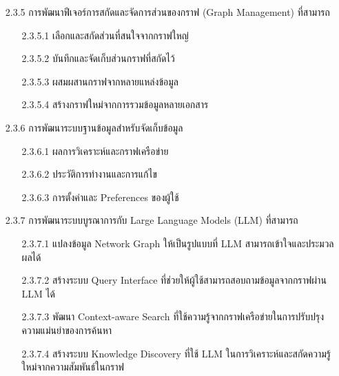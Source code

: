 \documentclass[12pt,a4paper]{article}
\begin{document}
\begin{enumerate}[leftmargin=2cm]
{\begin{enumerate}
\begin{enumerate}
            \end{enumerate}
            \item[2.3.5] การพัฒนาฟีเจอร์การสกัดและจัดการส่วนของกราฟ (Graph Management) ที่สามารถ
            \begin{enumerate}
                \item[2.3.5.1] เลือกและสกัดส่วนที่สนใจจากกราฟใหญ่
                \item[2.3.5.2] บันทึกและจัดเก็บส่วนกราฟที่สกัดไว้
                \item[2.3.5.3] ผสมผสานกราฟจากหลายแหล่งข้อมูล
                \item[2.3.5.4] สร้างกราฟใหม่จากการรวมข้อมูลหลายเอกสาร
            \end{enumerate}
            \item[2.3.6] การพัฒนาระบบฐานข้อมูลสำหรับจัดเก็บข้อมูล
            \begin{enumerate}
                \item[2.3.6.1] ผลการวิเคราะห์และกราฟเครือข่าย
                \item[2.3.6.2] ประวัติการทำงานและการแก้ไข
                \item[2.3.6.3] การตั้งค่าและ Preferences ของผู้ใช้
            \end{enumerate}
            \item[2.3.7] การพัฒนาระบบบูรณาการกับ Large Language Models (LLM) ที่สามารถ
            \begin{enumerate}
                \item[2.3.7.1] แปลงข้อมูล Network Graph ให้เป็นรูปแบบที่ LLM สามารถเข้าใจและประมวลผลได้
                \item[2.3.7.2] สร้างระบบ Query Interface ที่ช่วยให้ผู้ใช้สามารถสอบถามข้อมูลจากกราฟผ่าน LLM ได้
                \item[2.3.7.3] พัฒนา Context-aware Search ที่ใช้ความรู้จากกราฟเครือข่ายในการปรับปรุงความแม่นยำของการค้นหา
                \item[2.3.7.4] สร้างระบบ Knowledge Discovery ที่ใช้ LLM ในการวิเคราะห์และสกัดความรู้ใหม่จากความสัมพันธ์ในกราฟ
            \end{enumerate}
        \end{enumerate}
    }


\end{enumerate}
\end{document}
